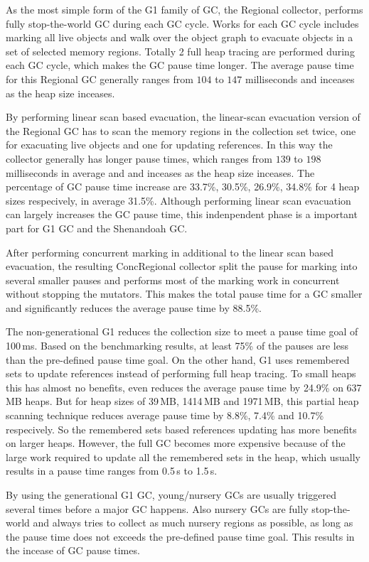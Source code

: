 As the most simple form of the G1 family of GC, the Regional collector, performs fully
stop-the-world GC during each GC cycle. Works for each GC cycle includes marking all
live objects and walk over the object graph to evacuate objects in a set of selected memory
regions. Totally 2 full heap tracing are performed during each GC cycle, which makes the GC
pause time longer. The average pause time for this Regional GC generally ranges from $104$ to $147$
milliseconds and inceases as the heap size inceases.

By performing linear scan based evacuation, the linear-scan evacuation version of the Regional
GC has to scan the memory regions in the collection set twice, one for exacuating live objects and
one for updating references. In this way the collector generally has longer pause times,
which ranges from $139$ to $198$ milliseconds in average and and inceases as the heap size inceases.
The percentage of GC pause time increase are 33.7\%, 30.5\%, 26.9\%, 34.8\% for 4 heap sizes
respecively, in average 31.5\%.
Although performing linear scan evacuation can largely increases the GC pause time,
this indenpendent phase is a important part for G1 GC and the Shenandoah GC.

After performing concurrent marking in additional to the linear scan based evacuation,
the resulting ConcRegional collector split the pause for marking into several smaller
pauses and performs most of the marking work in concurrent without stopping the mutators.
This makes the total pause time for a GC smaller and significantly reduces the average
pause time by 88.5\%.

The non-generational G1 reduces the collection size to meet a pause time goal of 100\,ms.
Based on the benchmarking results, at least 75\% of the pauses are less than the pre-defined
pause time goal. On the other hand, G1 uses remembered sets to update references
instead of performing full heap tracing.
To small heaps this has almost no benefits, even reduces the average pause time by
24.9\% on 637\,MB heaps. But for heap sizes of 39\,MB, 1414\,MB and 1971\,MB, this
partial heap scanning technique reduces average pause time by 8.8\%, 7.4\% and 10.7\%
respecively. So the remembered sets based references updating has more benefits on
larger heaps. However, the full GC becomes more expensive because of the large work required
to update all the remembered sets in the heap, which usually results in a pause time
ranges from 0.5\,s to 1.5\,s.

By using the generational G1 GC, young/nursery GCs are usually triggered several times
before a major GC happens. Also nursery GCs are fully stop-the-world and always tries
to collect as much nursery regions as possible, as long as the pause time does not exceeds
the pre-defined pause time goal. This results in the incease of GC pause times.

